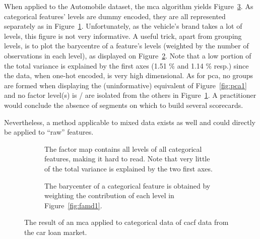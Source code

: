 When applied to the Automobile dataset, the \gls{mca} algorithm yields Figure~\ref{fig:mca}. As categorical features' levels are dummy encoded, they are all represented separately as in Figure~\ref{fig:mca1}. Unfortunately, as the vehicle's brand takes a lot of levels, this figure is not very informative. A useful trick, apart from grouping levels, is to plot the barycentre of a feature's levels (weighted by the number of observations in each level), as displayed on Figure~\ref{fig:mca2}. Note that a low portion of the total variance is explained by the first axes (1.51 \% and 1.14 \% resp.) since the data, when one-hot encoded, is very high dimensional. As for \gls{pca}, no groups are formed when displaying the (uninformative) equivalent of Figure~\ref{fig:pca1} and no factor level(s) is / are isolated from the others in Figure~\ref{fig:mca1}. A practitioner would conclude the absence of segments on which to build several scorecards.

Nevertheless, a method applicable to mixed data exists as well and could directly be applied to ``raw'' features.

\begin{figure}[!htb]
{\setlength{\parindent}{0cm}}

\begin{multicols}{2}
\centering
\begin{subfigure}[t]{0.45\textwidth}
\centering
\resizebox{\textwidth}{!}{}
\caption{\label{fig:mca1} The factor map contains all levels of all categorical features, making it hard to read. Note that very little of the total variance is explained by the two first axes.}
\end{subfigure}%
\columnbreak
\hspace*{1cm} \begin{subfigure}[t]{0.45\textwidth}
\centering
\resizebox{\textwidth}{!}{}
\caption{\label{fig:mca2} The barycenter of a categorical feature is obtained by weighting the contribution of each level in Figure~\ref{fig:famd1}.}
\end{subfigure}
\end{multicols}

\caption{\label{fig:mca} The result of an \gls{mca} applied to categorical data of \gls{cacf} data from the car loan market.}
\end{figure}

\paragraph{}

